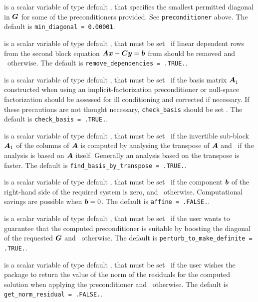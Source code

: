 \documentclass{galahad}
\begin{document}
\begin{description}


 is a scalar variable of type default \realdp, 
that specifies the smallest permitted diagonal in ${\bm{G}}$ for some
of the preconditioners provided. See {\tt preconditioner} above.
The default is {\tt min\_diagonal = 0.00001}.

 is a scalar variable of type default \logical, 
that must be set \true\ if linear dependent rows from the second
block equation ${\bm{A}} {\bm{x}} - {\bm{C}} {\bm{y}} = {\bm{b}}$ from 
should be removed and \false\ otherwise.
The default is {\tt remove\_dependencies = .TRUE.}.

 is a scalar variable of type default \logical, 
that must be set \true\ if the basis matrix ${\bm{A}}_{1}^{}$ constructed
when using an implicit-factorization preconditioner or null-space factorization 
should be assessed for ill conditioning and corrected if necessary. If these 
precautions are not thought necessary, {\tt check\_basis} should be
set \false. The default is {\tt check\_basis = .TRUE.}.

 is a scalar variable of type default \logical, 
that must be set \true\ if the invertible sub-block ${\bm{A}}_1$ of the 
columns of ${\bm{A}}$ is computed by analysing the transpose of ${\bm{A}}$ 
and \false\ if the analysis is based on ${\bm{A}}$ itself. Generally
an analysis based on the transpose is faster.
The default is {\tt find\_basis\_by\_transpose = .TRUE.}.

 is a scalar variable of type default \logical, 
that must be set \true\ if the component ${\bm{b}}$ of the right-hand side 
of the required system  is zero, and \false\ otherwise. 
Computational savings are possible when ${\bm{b}} = 0$. 
The default is {\tt affine = .FALSE.}.

 is a scalar variable of type default \logical, 
that must be set \true\ if the user wants to guarantee that the 
computed preconditioner is suitable by boosting the diagonal of the
requested ${\bm{G}}$ and \false\ otherwise.
The default is {\tt perturb\_to\_make\_definite = .TRUE.}.

 is a scalar variable of type default \logical, 
that must be set \true\ if the user wishes the package to return
the value of the norm of the residuals for the computed solution
when applying the preconditioner and  \false\ otherwise.
The default is {\tt get\_norm\_residual = .FALSE.}.


\end{description}
\end{document}
